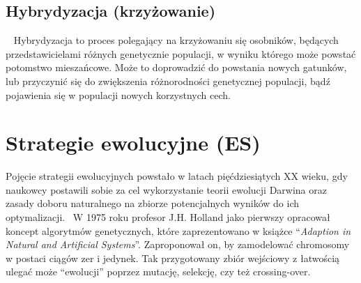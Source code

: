 \documentclass[twoside,a4paper,10]{book}
\begin{document}
 \subsection{ Hybrydyzacja (krzyżowanie) } ~\label{sec:hybryda}
Hybrydyzacja to proces polegający na krzyżowaniu się osobników, będących przedstawicielami różnych genetycznie populacji, w wyniku którego może powstać potomstwo mieszańcowe. Może to doprowadzić do powstania nowych gatunków, lub przyczynić się do zwiększenia różnorodności genetycznej populacji, bądź pojawienia się w populacji nowych korzystnych cech.~\cite{hybry}
\section{ Strategie ewolucyjne (ES) }
Pojęcie strategii ewolucyjnych powstało w latach pięćdziesiątych XX wieku, gdy naukowcy postawili sobie za cel wykorzystanie teorii ewolucji Darwina  oraz zasady doboru naturalnego na zbiorze potencjalnych wyników do ich optymalizacji.~\cite{javaGen} 
W 1975 roku profesor J.H. Holland jako pierwszy opracował koncept algorytmów genetycznych, które zaprezentowano w książce \enquote{\textit{Adaption in Natural and Artificial Systems}}. Zaproponował on, by zamodelować chromosomy w postaci ciągów zer i jedynek. Tak przygotowany zbiór wejściowy z łatwością ulegać może \enquote{ewolucji} poprzez mutację, selekcję, czy też crossing-over.~\cite{javaGen}
\end{document}
